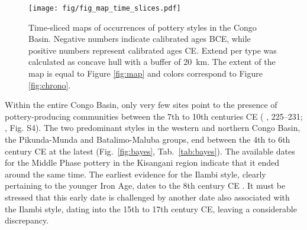 \documentclass[smallextended,natbib]{svjour3}       %
\begin{document}
\begin{figure}[!tbp]
	\centering
	\texttt{[image: fig/fig\_map\_time\_slices.pdf]}
	\caption{Time-sliced maps of occurrences of pottery styles in the Congo Basin. Negative numbers indicate calibrated ages BCE, while positive numbers represent calibrated ages CE. Extend per type was calculated as concave hull \citep{Gombin.2017} with a buffer of 20~km. The extent of the map is equal to Figure \ref{fig:map} and colors correspond to Figure \ref{fig:chrono}.}
	\label{fig:timeslices}
\end{figure}

Within the entire Congo Basin, only very few sites point to the presence of pottery-producing communities between the 7th to 10th centuries CE (\citeauthor{Seidensticker.2021e} \citeyear{Seidensticker.2021e}, 225--231; \citeauthor{Seidensticker.2021} \citeyear{Seidensticker.2021}, Fig. S4). The two predominant styles in the western and northern Congo Basin, the Pikunda-Munda and Batalimo-Maluba groups, end between the 4th to 6th century CE at the latest (Fig.~\ref{fig:bayes}, Tab.~\ref{tab:bayes}). The available dates for the Middle Phase pottery in the Kisangani region indicate that it ended around the same time. The earliest evidence for the Ilambi style, clearly pertaining to the younger Iron Age, dates to the 8th century CE \citep[98 Tab.~1]{LivingstoneSmith.2017}. It must be stressed that this early date is challenged by another date also associated with the Ilambi style, dating into the 15th to 17th century CE, leaving a considerable discrepancy.
\end{document}
